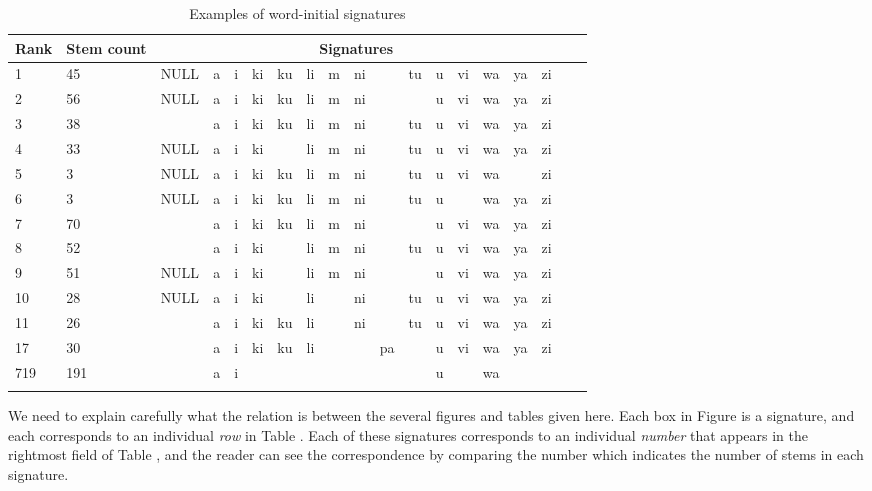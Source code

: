 \documentclass[output=paper,colorlinks,citecolor=brown,
]{langscibook}
\begin{document}
%
% 
\begin{table}
\begin{tabular}{lllllllllllllllllll}\lsptoprule
Rank& Stem count & \multicolumn{15}{c}{Signatures} \\ \midrule
1 & 45 & NULL & a &  i &  ki &  ku &  li &  m &  ni  &&  tu &  u &  vi &  wa &  ya &  zi \\
2 & 56 & NULL & a &  i &  ki &  ku &  li &  m &  ni &   & &  u &  vi &  wa & ya  &  zi   \\
3 & 38 &      & a &  i &  ki &  ku &  li &  m &  ni  &&  tu &  u &  vi &  wa &  ya &  zi \\
4 & 33 &  NULL & a &  i &  ki &  &  li &  m &  ni &   &  tu &  u &  vi &  wa &  ya &  zi  \\
5 & 3  & NULL & a &  i &  ki &  ku &  li &  m &  ni &   &  tu &  u &  vi &  wa &    &  zi\\
6 & 3 & NULL & a &  i &  ki &  ku &  li &  m &  ni &  &  tu &  u &   &  wa &  ya &  zi  \\
7 & 70 &    & a &  i &  ki &  ku &  li &  m &  ni  &&    &  u &  vi &  wa &  ya &  zi  \\
8 & 52 &   & a &  i &  ki &   &  li &  m &  ni &  &  tu  &  u &  vi &  wa &  ya &  zi  \\
9 & 51 & NULL & a &  i &  ki &   &  li & m &  ni &   &   &  u &  vi &  wa &  ya &  zi\\
10 & 28  & NULL & a &  i &  ki &   &  li &   & ni  &   &  tu &  u &  vi &  wa &  ya &  zi\\
11 & 26 & & a &  i &  ki & ku  &  li &    &  ni &   &  tu &  u &  vi &  wa &  ya &  zi \\
17 &  30 &  & a &  i &  ki &  ku &  li &   &    & pa &    &  u &  vi &  wa &  ya &  zi \\
719  & 191 && a &i &&&&&&&&u &&wa  \\  \lspbottomrule
\end{tabular}
\caption{Examples of word-initial signatures}
\label{topsigexamples}
\end{table}



  


We need to explain carefully what the relation is between the several figures and tables given here. Each box in Figure  is a signature, and each corresponds to an individual \textit{row} in Table . Each of these signatures corresponds to an individual \textit{number} that appears in the rightmost field of  Table , and the reader can see the correspondence by comparing the number which indicates the number of stems in each signature.
\end{document}
